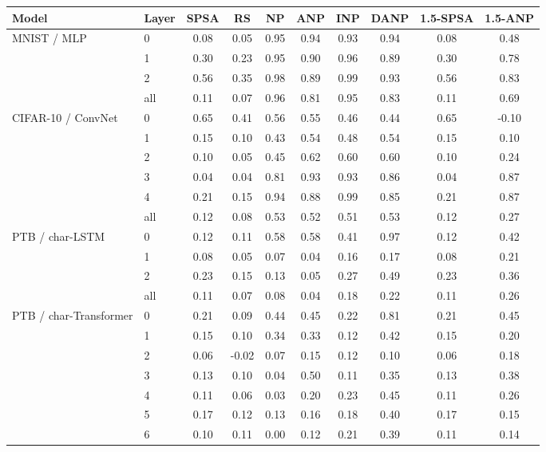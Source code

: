 \begin{tabular}{l l cccccccc}
\toprule
Model & Layer & SPSA & RS & NP & ANP & INP & DANP & 1.5-SPSA & 1.5-ANP \\
\midrule
MNIST / MLP & 0 & 0.08 & 0.05 & 0.95 & 0.94 & 0.93 & 0.94 & 0.08 & 0.48 \\
 & 1 & 0.30 & 0.23 & 0.95 & 0.90 & 0.96 & 0.89 & 0.30 & 0.78 \\
 & 2 & 0.56 & 0.35 & 0.98 & 0.89 & 0.99 & 0.93 & 0.56 & 0.83 \\
 & all & 0.11 & 0.07 & 0.96 & 0.81 & 0.95 & 0.83 & 0.11 & 0.69 \\
\midrule
CIFAR-10 / ConvNet & 0 & 0.65 & 0.41 & 0.56 & 0.55 & 0.46 & 0.44 & 0.65 & -0.10 \\
 & 1 & 0.15 & 0.10 & 0.43 & 0.54 & 0.48 & 0.54 & 0.15 & 0.10 \\
 & 2 & 0.10 & 0.05 & 0.45 & 0.62 & 0.60 & 0.60 & 0.10 & 0.24 \\
 & 3 & 0.04 & 0.04 & 0.81 & 0.93 & 0.93 & 0.86 & 0.04 & 0.87 \\
 & 4 & 0.21 & 0.15 & 0.94 & 0.88 & 0.99 & 0.85 & 0.21 & 0.87 \\
 & all & 0.12 & 0.08 & 0.53 & 0.52 & 0.51 & 0.53 & 0.12 & 0.27 \\
\midrule
PTB / char-LSTM & 0 & 0.12 & 0.11 & 0.58 & 0.58 & 0.41 & 0.97 & 0.12 & 0.42 \\
 & 1 & 0.08 & 0.05 & 0.07 & 0.04 & 0.16 & 0.17 & 0.08 & 0.21 \\
 & 2 & 0.23 & 0.15 & 0.13 & 0.05 & 0.27 & 0.49 & 0.23 & 0.36 \\
 & all & 0.11 & 0.07 & 0.08 & 0.04 & 0.18 & 0.22 & 0.11 & 0.26 \\
\midrule
PTB / char-Transformer & 0 & 0.21 & 0.09 & 0.44 & 0.45 & 0.22 & 0.81 & 0.21 & 0.45 \\
 & 1 & 0.15 & 0.10 & 0.34 & 0.33 & 0.12 & 0.42 & 0.15 & 0.20 \\
 & 2 & 0.06 & -0.02 & 0.07 & 0.15 & 0.12 & 0.10 & 0.06 & 0.18 \\
 & 3 & 0.13 & 0.10 & 0.04 & 0.50 & 0.11 & 0.35 & 0.13 & 0.38 \\
 & 4 & 0.11 & 0.06 & 0.03 & 0.20 & 0.23 & 0.45 & 0.11 & 0.26 \\
 & 5 & 0.17 & 0.12 & 0.13 & 0.16 & 0.18 & 0.40 & 0.17 & 0.15 \\
 & 6 & 0.10 & 0.11 & 0.00 & 0.12 & 0.21 & 0.39 & 0.11 & 0.14 \\

\end{tabular}

